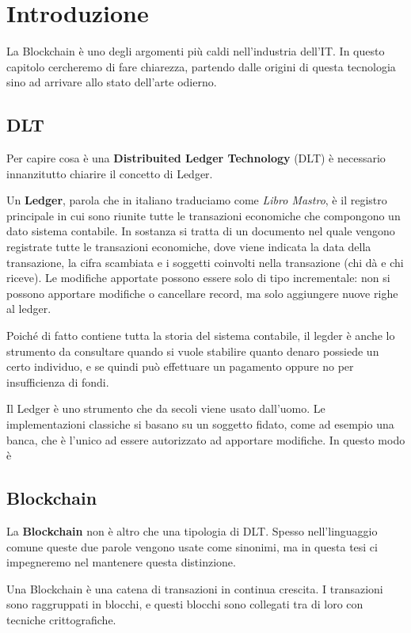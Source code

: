 \chapter{Introduzione}

La Blockchain è uno degli argomenti più caldi nell'industria dell'IT. In questo
capitolo cercheremo di fare chiarezza, partendo dalle origini di questa tecnologia
sino ad arrivare allo stato dell'arte odierno.

\section{DLT}
Per capire cosa è una \textbf{Distribuited Ledger Technology} (DLT) è necessario
innanzitutto chiarire il concetto di Ledger.

Un \textbf{Ledger}, parola che in italiano traduciamo come \textit{Libro Mastro},
è il registro principale in cui sono riunite tutte le transazioni economiche
che compongono un dato sistema contabile. In sostanza si tratta di un documento
nel quale vengono registrate tutte le transazioni economiche, dove viene
indicata la data della transazione, la cifra scambiata e i soggetti coinvolti
nella transazione (chi dà e chi riceve). Le modifiche apportate possono essere solo
di tipo incrementale: non si possono apportare modifiche o cancellare record,
ma solo aggiungere nuove righe al ledger.

Poiché di fatto contiene tutta la storia del sistema contabile, il legder è anche
lo strumento da consultare quando si vuole stabilire quanto denaro possiede un certo
individuo, e se quindi può effettuare un pagamento oppure no per insufficienza
di fondi.

Il Ledger è uno strumento che da secoli viene usato dall'uomo. Le implementazioni
classiche si basano su un soggetto fidato, come ad esempio una banca, che è
l'unico ad essere autorizzato ad apportare modifiche. In questo modo è



\section{Blockchain}
La \textbf{Blockchain} non è altro che una tipologia di DLT. Spesso nell'linguaggio
comune queste due parole vengono usate come sinonimi, ma in questa tesi ci impegneremo
nel mantenere questa distinzione.

Una Blockchain è una catena di transazioni in continua crescita. I transazioni sono
raggruppati in blocchi, e questi blocchi sono collegati tra di loro con tecniche
crittografiche.

